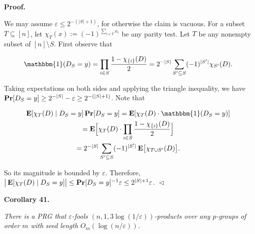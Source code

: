 


\par\medskip\noindent\textbf{
\textbf{Proof}.}\par




We may assume $\varepsilon\leq 2^{-(\lvert S\rvert+1)}$, for otherwise the claim is vacuous.
For a subset $T\subseteq[n]$, let $\chi_{T}(x):=(-1)^{\sum_{i\in T}x_{i}}$ be any parity test.
Let $T$ be any nonempty subset of $[n]\setminus S$.
First observe that\par


\[\begin{gathered}
\mathbbm{1}(D_{S}=y)=\prod_{i\in S}\frac{1-\chi_{\{i\}}(D)}{2}=2^{-\lvert S\rvert}\sum_{S^{\prime}\subseteq S}(-1)^{\lvert S^{\prime}\rvert}\chi_{S^{\prime}}(D).
\end{gathered}\]


Taking expectations on both sides and applying the triangle inequality, we have $\mathop{\bf Pr\/}[D_{S}=y]\geq 2^{-\lvert S\rvert}-\varepsilon\geq 2^{-(\lvert
S\rvert+1)}$.
Note that\par


\[\begin{gathered}
\displaystyle\mathop{\bf E\/}[\chi_{T}(D)\mid D_{S}=y]\mathop{\bf Pr\/}[D_{S}=y] \displaystyle=\mathop{\bf E\/}[\chi_{T}(D)\cdot\mathbbm{1}(D_{S}=y)] \\
\displaystyle=\mathop{\bf E\/}\Bigl{[}\chi_{T}(D)\cdot\prod_{i\in S}\frac{1-\chi_{\{i\}}(D)}{2}\Bigr{]} \\
\displaystyle=2^{-\lvert S\rvert}\sum_{S^{\prime}\subseteq S}(-1)^{\lvert S^{\prime}\rvert}\mathop{\bf E\/}\bigl{[}\chi_{T\cup S^{\prime}}(D)\bigr{]}.
\end{gathered}\]


So its magnitude is bounded by $\varepsilon$.
Therefore, $\big{\lvert}\mathop{\bf E\/}[\chi_{T}(D)\mid D_{S}=y]\big{\rvert}\leq\mathop{\bf Pr\/}[D_{S}=y]^{-1}\varepsilon\leq 2^{\lvert S\rvert+1}\varepsilon$.
$\vartriangleleft$\par





\par\medskip\noindent\textbf{
\textbf{Corollary 41}\textbf{.}
}\par



\emph{There is a PRG that $\varepsilon$-fools $(n,1,3\log(1/\varepsilon))$-products over any $p$-groups of order $m$ with seed length $O_{m}(\log(n/\varepsilon))$.}\par



